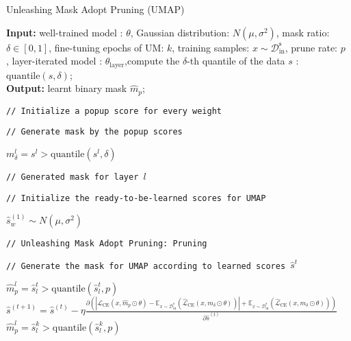 \documentclass{article}
\theoremstyle{plain}
\theoremstyle{definition}
\theoremstyle{remark}
\begin{document}
\begin{algorithm}[h!]
\caption{Unleashing Mask Adopt Pruning (UMAP)}
  \label{alg:umap}
  {\bf Input:} well-trained model : $\theta$, Gaussian distribution: $N(\mu, \sigma^2)$, mask ratio: $\delta \in [0, 1]$, fine-tuning epochs of UM: $k$, training samples: $x \sim \mathcal{D}^\text{s}_\text{in}$, prune rate: $p$ , layer-iterated model : $\theta_{\text{layer}}$,compute the $\delta$-th quantile of the data $s$ : $\text{quantile}(s, \delta)$;\\
  {\bf Output:} learnt binary mask $\hat{m}_p$;
\begin{algorithmic}[1]
    \STATE \begin{footnotesize}\texttt{// Initialize a popup score for every weight}\end{footnotesize}\vspace{2mm}
    \ENDFOR\vspace{2mm}
\STATE \begin{footnotesize}\texttt{// Generate mask by the popup scores}\end{footnotesize}\vspace{2mm}
        \STATE $m_\delta^l = s^l > \text{quantile}(s^l, \delta)$ \begin{footnotesize}\texttt{// Generated mask for layer $l$}\end{footnotesize}
    \ENDFOR\vspace{2mm}
\STATE \begin{footnotesize}\texttt{// Initialize the ready-to-be-learned scores for UMAP}\end{footnotesize}\vspace{2mm}
        \STATE $\hat{s}^{(1)}_w \sim N(\mu, \sigma^2)$
    \ENDFOR\vspace{2mm}
    \STATE \begin{footnotesize}\texttt{// Unleashing Mask Adopt Pruning: Pruning}\end{footnotesize}\vspace{2mm}
        \STATE \begin{footnotesize}\texttt{// Generate the mask for UMAP according to learned scores $\hat{s}^{t}$}\end{footnotesize}
            \STATE $\hat{m}_p^l = \hat{s}^{t}_{l} > \text{quantile}(\hat{s}^{t}_{l}, p)$ 
        \ENDFOR
        \STATE $\hat{s}^{(t + 1)} = \hat{s}^{(t)} - \eta \frac{\partial(|\mathcal{L}_{\text{CE}}(x, \hat{m}_p \odot\theta) - \mathbb{E}_{x \sim \mathcal{D}^\text{s}_\text{in}}(\hat{\mathcal{L}}_{\text{CE}}(x, m_\delta \odot \theta))| + \mathbb{E}_{x \sim \mathcal{D}^\text{s}_\text{in}}(\hat{\mathcal{L}}_{\text{CE}}(x, m_\delta \odot \theta)))}{\partial\hat{s}^{(t)}}$
    \ENDFOR
        \STATE $\hat{m}^l_p = \hat{s}^{k}_{l} > \text{quantile}(\hat{s}^{k}_{l}, p)$ 
    \ENDFOR
\end{algorithmic}
\end{algorithm}
\end{document}
